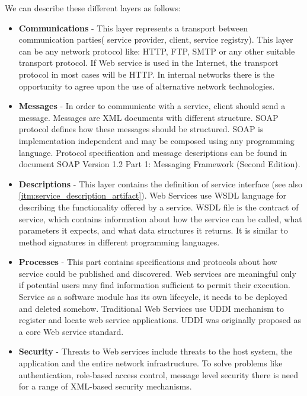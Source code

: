 We can describe these different layers as follows:
\begin{itemize}
  \item \textbf{Communications} - This layer represents a transport between
  communication parties( service provider, client, service registry). This layer
  can be any network protocol like: HTTP, FTP, SMTP or any
  other suitable transport protocol. If Web service is used in the Internet, the
  transport protocol in most cases will be HTTP. In internal networks there is the opportunity to agree upon the use of alternative
network technologies.

\item \textbf{Messages} - In order to communicate with a service, client should
send a message. Messages are XML documents with different structure.
SOAP protocol defines how these messages should be structured.
SOAP is implementation independent and may be composed using any
programming language. Protocol specification and message descriptions can be
found in document SOAP Version 1.2 Part 1: Messaging Framework (Second
Edition)\cite{soap_protocol_spec}.

\item \textbf{Descriptions} - This layer contains the definition of service
interface (see also \autoref{itm:service_description_artifact}). Web Services
use WSDL language for describing the functionality offered by a service.
WSDL file is the contract of service, which contains information about how
the service can be called, what parameters it expects, and what data structures it returns.
It is similar to method signatures in different programming languages.

\item \textbf{Processes} - This part contains specifications and protocols
about how service could be published and discovered. Web services are meaningful
only if potential users may find information sufficient to permit their execution.
Service as a software module has its own lifecycle, it needs to be deployed and deleted somehow.
Traditional Web Services use UDDI  mechanism to register and locate web
service applications. UDDI was originally proposed as a core Web service
standard.

\item \textbf{Security} - Threats to Web services include threats to the host
system, the application and the entire network infrastructure. To solve problems
like authentication, role-based access control, message level security there is
need for a range of XML-based security mechanisms.


\end{itemize}

